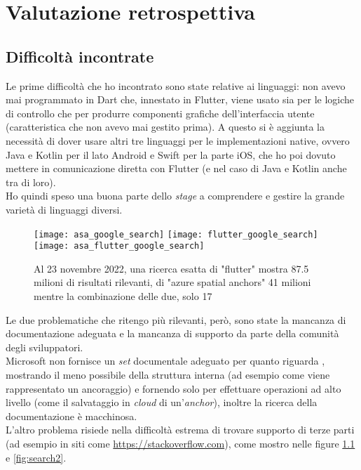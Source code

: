 
\chapter{Valutazione retrospettiva}
\label{cap:valutazione-retrospettiva}

\section{Difficoltà incontrate}
\label{sec:difficolta_incontrate}
Le prime difficoltà che ho incontrato sono state relative ai linguaggi: non avevo mai programmato in Dart che, innestato in Flutter, viene usato sia per le logiche di controllo che per produrre componenti grafiche dell'interfaccia utente (caratteristica che non avevo mai gestito prima). A questo si è aggiunta la necessità di dover usare altri tre linguaggi per le implementazioni native, ovvero Java e Kotlin per il lato Android e Swift per la parte iOS, che ho poi dovuto mettere in comunicazione diretta con Flutter (e nel caso di Java e Kotlin anche tra di loro).\\ 
Ho quindi speso una buona parte dello \textit{stage} a comprendere e gestire la grande varietà di linguaggi diversi.

\begin{figure}[H]
  \centering
  \texttt{[image: asa\_google\_search]}\hfill
  \texttt{[image: flutter\_google\_search]}\\
  \texttt{[image: asa\_flutter\_google\_search]}
  \caption[Ricerca esatta Flutter e ASA 23 novembre]{Al 23 novembre 2022, una ricerca esatta di "flutter" mostra 87.5 milioni di risultati rilevanti, di "azure spatial anchors" 41 milioni mentre la combinazione delle due, solo 17}
\label{fig:search1}
\end{figure}

Le due problematiche che ritengo più rilevanti, però, sono state la mancanza di documentazione adeguata e la mancanza di supporto da parte della comunità degli sviluppatori.\\
Microsoft non fornisce un \textit{set} documentale adeguato per quanto riguarda \asa{}, mostrando il meno possibile della struttura interna (ad esempio come viene rappresentato un ancoraggio) e fornendo solo \api{} per effettuare operazioni ad alto livello (come il salvataggio in \textit{cloud} di un'\textit{anchor}), inoltre la ricerca della documentazione è macchinosa.\\
L'altro problema risiede nella difficoltà estrema di trovare supporto di terze parti (ad esempio in siti come \url{https://stackoverflow.com}), come mostro nelle figure \ref{fig:search1} e \ref{fig:search2}.

